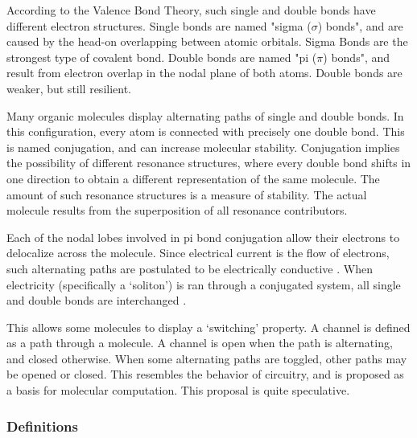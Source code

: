 \documentclass[12pt]{article}
\begin{document}
According to the Valence Bond Theory, such single and double bonds have different electron structures. Single bonds are named "sigma ($\sigma$) bonds", and are caused by the head-on overlapping between atomic orbitals. Sigma Bonds are the strongest type of covalent bond. Double bonds are named "pi ($\pi$) bonds", and result from electron overlap in the nodal plane of both atoms. Double bonds are weaker, but still resilient.

Many organic molecules display alternating paths of single and double bonds. In this configuration, every atom is connected with precisely one double bond. This is named conjugation, and can increase molecular stability. Conjugation implies the possibility of different resonance structures, where every double bond shifts in one direction to obtain a different representation of the same molecule. The amount of such resonance structures is a measure of stability. The actual molecule results from the superposition of all resonance contributors.

Each of the nodal lobes involved in pi bond conjugation allow their electrons to delocalize across the molecule. Since electrical current is the flow of electrons, such alternating paths are postulated to be electrically conductive \cite{H13,HK88}. When electricity (specifically a `soliton') is ran through a conjugated system, all single and double bonds are interchanged \cite{HK88}. 

This allows some molecules to display a `switching' property. A channel is defined as a path through a molecule. A channel is open when the path is alternating, and closed otherwise. When some alternating paths are toggled, other paths may be opened or closed. This resembles the behavior of circuitry, and is proposed as a basis for molecular computation. This proposal is quite speculative.

\subsubsection{Definitions}
\end{document}
